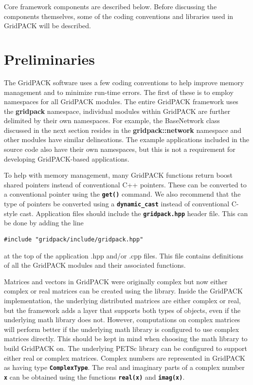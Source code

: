 \documentclass[12pt]{report} %
\begin{document}
Core framework components are described below. Before discussing the components themselves, some of the coding conventions and libraries used in GridPACK will be described.

\section{Preliminaries} The GridPACK software uses a few coding conventions to help improve memory management and to minimize run-time errors. The first of these is to employ namespaces for all GridPACK modules. The entire GridPACK framework uses the \textbf{gridpack} namespace, individual modules within GridPACK are further delimited by their own namespaces. For example, the BaseNetwork class discussed in the next section resides in the \textbf{gridpack::network} namespace and other modules have similar delineations. The example applications included in the source code also have their own namespaces, but this is not a requirement for developing GridPACK-based applications.

To help with memory management, many GridPACK functions return boost shared pointers instead of conventional C++ pointers. These can be converted to a conventional pointer using the \texttt{\textbf{get()}} command. We also recommend that the type of pointers be converted using a \texttt{\textbf{dynamic\_cast}} instead of conventional C-style cast.
Application files should include the \texttt{\textbf{gridpack.hpp}} header file. This can be done by adding the line

{
\color{red}
\begin{Verbatim}[fontseries=b]
    #include "gridpack/include/gridpack.hpp"
\end{Verbatim}
}

at the top of the application .hpp and/or .cpp files. This file contains definitions of all the GridPACK modules and their associated functions.

Matrices and vectors in GridPACK were originally complex but now either complex or real matrices can be created using the library. Inside the GridPACK implementation, the underlying distributed matrices are either complex or real, but the framework adds a layer that supports both types of objects, even if the underlying math library does not. However, computations on complex matrices will perform better if the underlying math library is configured to use complex matrices directly. This should be kept in mind when choosing the math library to build GridPACK on. The underlying PETSc library can be configured to support either real or complex matrices. Complex numbers are represented in GridPACK as having type \texttt{\textbf{ComplexType}}. The real and imaginary parts of a complex number \texttt{\textbf{x}} can be obtained using the functions \texttt{\textbf{real(x)}} and \texttt{\textbf{imag(x)}}.
\end{document}
